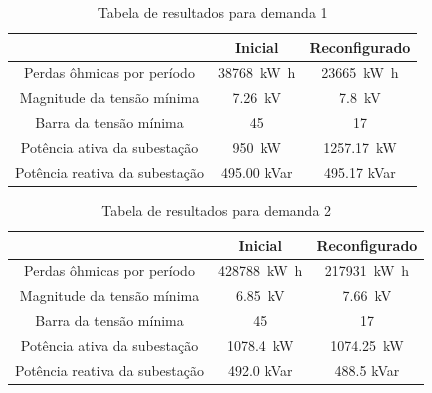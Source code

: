 \begin{table}[H]
    \centering
    \caption{Tabela de resultados para demanda 1}
    \begin{tabular}{|c|c|c|}
    \hline
                                   & Inicial              & Reconfigurado               \\\hline
    Perdas ôhmicas por período       & \SI{38768}{\kilo\watt\hour}      & \SI{23665}{\kilo\watt\hour}  \\\hline
    Magnitude da tensão mínima     & \SI{7.26}{\kilo\volt}    & \SI{7.8}{\kilo\volt}   \\\hline
    Barra da tensão mínima         & 45                       & 17                      \\\hline
    Potência ativa da subestação   & \SI{950}{\kilo\watt} & \SI{1257.17}{\kilo\watt}\\\hline
    Potência reativa da subestação & 495.00 kVar              & 495.17 kVar      \\\hline
    \end{tabular}
    \label{tab:45prop1}
\end{table}

\begin{table}[H]
    \centering
    \caption{Tabela de resultados para demanda 2}
    \begin{tabular}{|c|c|c|}
    \hline
                                   & Inicial              & Reconfigurado               \\\hline
    Perdas ôhmicas por período       & \SI{428788}{\kilo\watt\hour}      & \SI{217931}{\kilo\watt\hour}  \\\hline
    Magnitude da tensão mínima     & \SI{6.85}{\kilo\volt}    & \SI{7.66}{\kilo\volt}   \\\hline
    Barra da tensão mínima         & 45                       & 17                      \\\hline
    Potência ativa da subestação   & \SI{1078.4}{\kilo\watt} & \SI{1074.25}{\kilo\watt}\\\hline
    Potência reativa da subestação & 492.0 kVar              & 488.5 kVar      \\\hline
    \end{tabular}
    \label{tab:45prop2}
\end{table}

